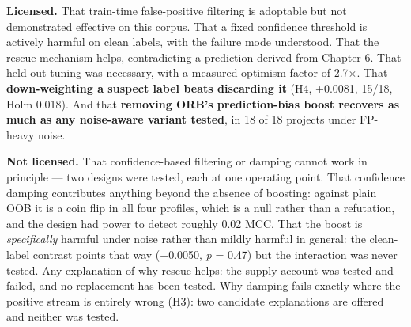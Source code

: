 \textbf{Licensed.} That train-time false-positive filtering is adoptable
but not demonstrated effective on this corpus. That a fixed confidence
threshold is actively harmful on clean labels, with the failure mode
understood. That the rescue mechanism helps, contradicting a prediction
derived from Chapter 6. That held-out tuning was necessary, with a
measured optimism factor of 2.7\ensuremath{\times}. That \textbf{down-weighting a suspect
label beats discarding it} (H4, +0.0081, 15/18, Holm 0.018). And that
\textbf{removing ORB's prediction-bias boost recovers as much as any
noise-aware variant tested}, in 18 of 18 projects under FP-heavy noise.

\textbf{Not licensed.} That confidence-based filtering or damping cannot
work in principle --- two designs were tested, each at one operating
point. That confidence damping contributes anything beyond the absence
of boosting: against plain OOB it is a coin flip in all four profiles,
which is a null rather than a refutation, and the design had power to
detect roughly 0.02 MCC. That the boost is \emph{specifically} harmful
under noise rather than mildly harmful in general: the clean-label
contrast points that way (+0.0050, \emph{p} = 0.47) but the interaction
was never tested. Any explanation of why rescue helps: the supply
account was tested and failed, and no replacement has been tested. Why
damping fails exactly where the positive stream is entirely wrong (H3):
two candidate explanations are offered and neither was tested.
